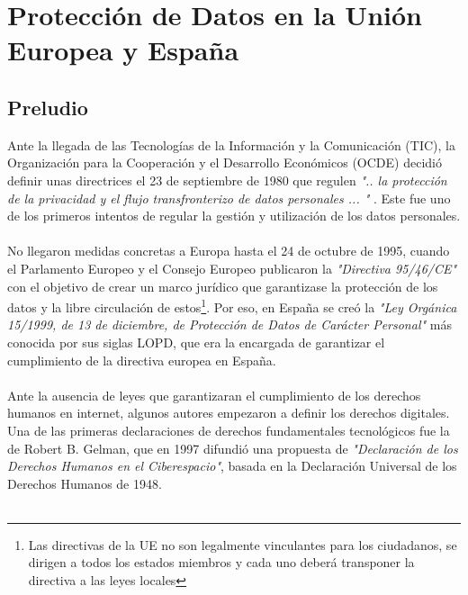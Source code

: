 \appendix

\chapter{Protección de Datos en la Unión Europea y España}\label{appendix:ProteccionDatos}
\thispagestyle{fancy}
\begin{refsection}

\section{Preludio}
Ante la llegada de las Tecnologías de la Información y la Comunicación (TIC), la Organización para la Cooperación y el Desarrollo Económicos (OCDE) decidió definir unas directrices el 23 de septiembre de 1980 que regulen \textit{".. la protección de la privacidad y el flujo transfronterizo de datos personales ... "} \autocite[]{oecdOECDGuidelinesProtection2002}. Este fue uno de los primeros intentos de regular la gestión y utilización de los datos personales.
\\ \\
No llegaron medidas concretas a Europa hasta el 24 de octubre de 1995, cuando el Parlamento Europeo y el Consejo Europeo publicaron la \textit{"Directiva 95/46/CE"} \autocite{DIRECTIVA9546} con el objetivo de crear un marco jurídico que garantizase la protección de los datos y la libre circulación de estos\footnote{Las directivas de la UE no son legalmente vinculantes para los ciudadanos, se dirigen a todos los estados miembros y cada uno deberá transponer la directiva a las leyes locales}. Por eso, en España se creó la \textit{"Ley Orgánica 15/1999, de 13 de diciembre, de Protección de Datos de Carácter Personal"} \autocite{LEYORGANICA15} más conocida por sus siglas LOPD, que era la encargada de garantizar el cumplimiento de la directiva europea en España. 
\\ \\
Ante la ausencia de leyes que garantizaran el cumplimiento de los derechos humanos en internet, algunos autores empezaron a definir los derechos digitales. Una de las primeras declaraciones de derechos fundamentales tecnológicos fue la de Robert B. Gelman, que en 1997 difundió una propuesta de \textit{"Declaración de los Derechos Humanos en el Ciberespacio"}, basada en la Declaración Universal de los Derechos Humanos de 1948.
\\ \\

\end{refsection}
